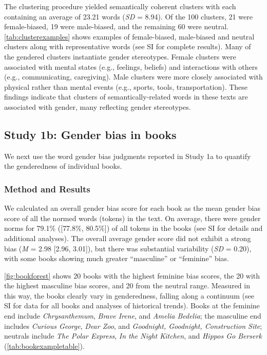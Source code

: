 \documentclass[
  english,
  ,man,floatsintext]{apa6}
\begin{document}
The clustering procedure yielded semantically coherent clusters with each containing an average of 23.21 words (\emph{SD} = 8.94). Of the 100 clusters, 21 were female-biased, 19 were male-biased, and the remaining 60 were neutral. \autoref{tab:clusterexamples} shows examples of female-biased, male-biased and neutral clusters along with representative words (see SI for complete results). Many of the gendered clusters instantiate gender stereotypes. Female clusters were associated with mental states (e.g., feelings, beliefs) and interactions with others (e.g., communicating, caregiving). Male clusters were more closely associated with physical rather than mental events (e.g., sports, tools, transportation). These findings indicate that clusters of semantically-related words in these texts are associated with gender, many reflecting gender stereotypes.

\hypertarget{study-1b-gender-bias-in-books}{%
\subsection{Study 1b: Gender bias in books}\label{study-1b-gender-bias-in-books}}

We next use the word gender bias judgments reported in Study 1a to quantify the genderedness of individual books.

\hypertarget{method-and-results}{%
\subsubsection{Method and Results}\label{method-and-results}}

We calculated an overall gender bias score for each book as the mean gender bias score of all the normed words (tokens) in the text. On average, there were gender norms for 79.1\% ({[}77.8\%, 80.5\%{]}) of all tokens in the books (see SI for details and additional analyses). The overall average gender score did not exhibit a strong bias (\emph{M} = 2.98 {[}2.96, 3.01{]}), but there was substantial variability (\emph{SD} = 0.20), with some books showing much greater \enquote{masculine} or \enquote{feminine} bias.

\autoref{fig:bookforest} shows 20 books with the highest feminine bias scores, the 20 with the highest masculine bias scores, and 20 from the neutral range. Measured in this way, the books clearly vary in genderedness, falling along a continuum (see SI for data for all books and analyses of historical trends). Books at the feminine end include \emph{Chrysanthemum}, \emph{Brave Irene}, and \emph{Amelia Bedelia}; the masculine end includes \emph{Curious George}, \emph{Dear Zoo}, and \emph{Goodnight, Goodnight, Construction Site}; neutrals include \emph{The Polar Express}, \emph{In the Night Kitchen}, and \emph{Hippos Go Berserk} (\autoref{tab:bookexampletable}).
\end{document}
